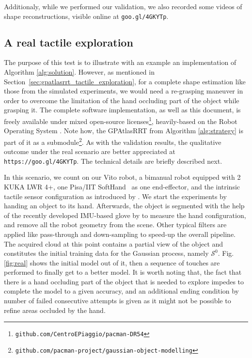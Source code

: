 Additionaly, while we performed our validation, we also recorded some videos of shape reconstructions, visible online at \texttt{goo.gl/4GKYTp}.

\vspace{-2em}
\subsection{A real tactile exploration}
\label{sec:real}

The purpose of this test is to illustrate with an example an implementation of Algorithm \ref{alg:solution}. However, as mentioned in Section~\ref{sec:gpatlasrrt_tactile_exploration}, for a complete shape estimation like those from  the simulated experiments, we would need a re-grasping maneuver in order to overcome the limitation of the hand occluding part of the object while grasping it. The complete software implementation, as well as this document, is freely available under mixed open-source licenses\footnote{\texttt{github.com/CentroEPiaggio/pacman-DR54}}, heavily-based on the Robot Operating System \citet{ROS}. Note how, the GPAtlasRRT from Algorithm \ref{alg:strategy} is part of it as a submodule\footnote{\texttt{github.com/pacman-project/gaussian-object-modelling}}. As with the validation results, the qualitative outcome under the real scenario are better appreciated at \texttt{https://goo.gl/4GKYTp}. The technical details are briefly described next.

In this scenario, we count on our Vito robot, a bimanual robot equipped with 2 KUKA LWR 4+, one Pisa/IIT SoftHand~\citep{Catalano2014Adaptive} as one end-effector, and the intrinsic tactile sensor configuration as introduced by \citet{Rosales2014Active}. We start the experiments by handing an object to its hand. Afterwards, the object is segmented with the help of the recently developed IMU-based glove by \citet{Santaera2015Lowcost} to measure the hand configuration, and remove all the robot geometry from the scene. Other typical filters are applied like pass-through and down-sampling to speed-up the overall pipeline. The acquired cloud at this point contains a partial view of the object and constitutes the initial training data for the Gaussian process, namely $\mathcal{S}^0$. Fig. \ref{fig:real} shows the initial model out of it, then a sequence of touches are performed to finally get to a better model. It is worth noting that, the fact that there is a hand occluding part of the object that is needed to explore impedes to complete the model to a given accuracy, and an additional ending condition by number of failed consecutive attempts is given as it might not be possible to refine areas occluded by the hand.

